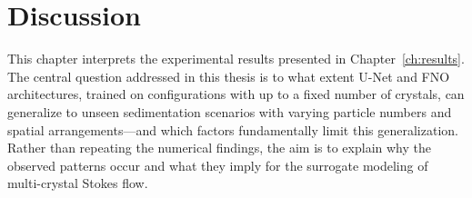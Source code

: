 %
%
%
%
%
%
\chapter{Discussion}
\label{ch:discussion}

This chapter interprets the experimental results presented in Chapter~\ref{ch:results}. The central question addressed in this thesis is to what extent U-Net and FNO architectures, trained on configurations with up to a fixed number of crystals, can generalize to unseen sedimentation scenarios with varying particle numbers and spatial arrangements—and which factors fundamentally limit this generalization. Rather than repeating the numerical findings, the aim is to explain why the observed patterns occur and what they imply for the surrogate modeling of multi-crystal Stokes flow.

